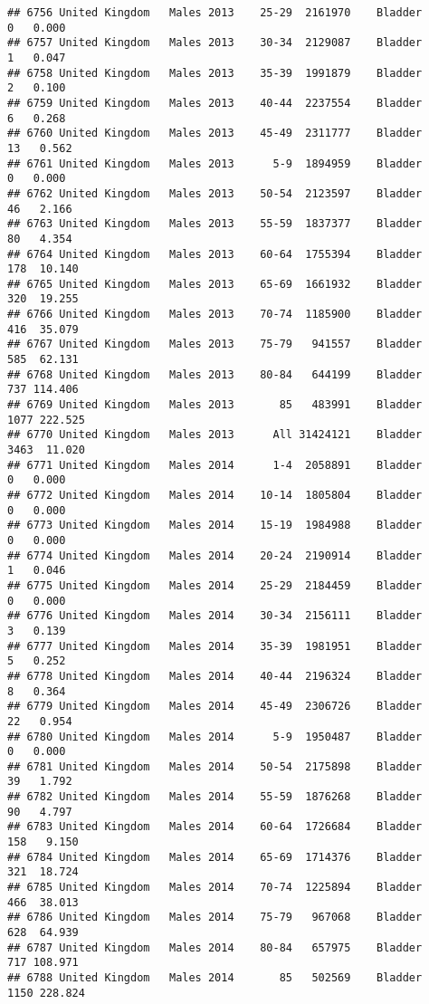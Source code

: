 \documentclass[
]{article}
\begin{document}
\begin{verbatim}
## 6756 United Kingdom   Males 2013    25-29  2161970    Bladder      0   0.000
## 6757 United Kingdom   Males 2013    30-34  2129087    Bladder      1   0.047
## 6758 United Kingdom   Males 2013    35-39  1991879    Bladder      2   0.100
## 6759 United Kingdom   Males 2013    40-44  2237554    Bladder      6   0.268
## 6760 United Kingdom   Males 2013    45-49  2311777    Bladder     13   0.562
## 6761 United Kingdom   Males 2013      5-9  1894959    Bladder      0   0.000
## 6762 United Kingdom   Males 2013    50-54  2123597    Bladder     46   2.166
## 6763 United Kingdom   Males 2013    55-59  1837377    Bladder     80   4.354
## 6764 United Kingdom   Males 2013    60-64  1755394    Bladder    178  10.140
## 6765 United Kingdom   Males 2013    65-69  1661932    Bladder    320  19.255
## 6766 United Kingdom   Males 2013    70-74  1185900    Bladder    416  35.079
## 6767 United Kingdom   Males 2013    75-79   941557    Bladder    585  62.131
## 6768 United Kingdom   Males 2013    80-84   644199    Bladder    737 114.406
## 6769 United Kingdom   Males 2013       85   483991    Bladder   1077 222.525
## 6770 United Kingdom   Males 2013      All 31424121    Bladder   3463  11.020
## 6771 United Kingdom   Males 2014      1-4  2058891    Bladder      0   0.000
## 6772 United Kingdom   Males 2014    10-14  1805804    Bladder      0   0.000
## 6773 United Kingdom   Males 2014    15-19  1984988    Bladder      0   0.000
## 6774 United Kingdom   Males 2014    20-24  2190914    Bladder      1   0.046
## 6775 United Kingdom   Males 2014    25-29  2184459    Bladder      0   0.000
## 6776 United Kingdom   Males 2014    30-34  2156111    Bladder      3   0.139
## 6777 United Kingdom   Males 2014    35-39  1981951    Bladder      5   0.252
## 6778 United Kingdom   Males 2014    40-44  2196324    Bladder      8   0.364
## 6779 United Kingdom   Males 2014    45-49  2306726    Bladder     22   0.954
## 6780 United Kingdom   Males 2014      5-9  1950487    Bladder      0   0.000
## 6781 United Kingdom   Males 2014    50-54  2175898    Bladder     39   1.792
## 6782 United Kingdom   Males 2014    55-59  1876268    Bladder     90   4.797
## 6783 United Kingdom   Males 2014    60-64  1726684    Bladder    158   9.150
## 6784 United Kingdom   Males 2014    65-69  1714376    Bladder    321  18.724
## 6785 United Kingdom   Males 2014    70-74  1225894    Bladder    466  38.013
## 6786 United Kingdom   Males 2014    75-79   967068    Bladder    628  64.939
## 6787 United Kingdom   Males 2014    80-84   657975    Bladder    717 108.971
## 6788 United Kingdom   Males 2014       85   502569    Bladder   1150 228.824

\end{verbatim}
\end{document}
